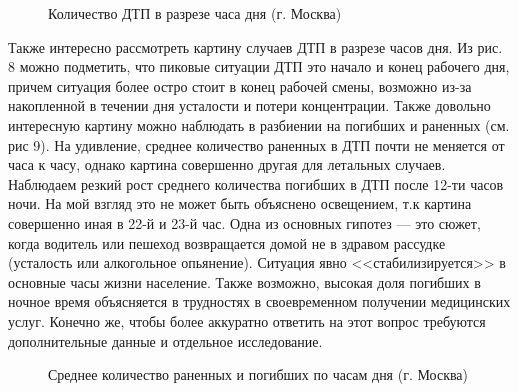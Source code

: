 \documentclass[a4paper, 14pt]{article}
\begin{document}
\begin{figure}[h]
	\caption{Количество ДТП в разрезе часа дня (г. Москва)}
\end{figure}

Также интересно рассмотреть картину случаев ДТП в разрезе часов дня. Из рис. 8 можно подметить, что пиковые ситуации ДТП это начало и конец рабочего дня, причем ситуация более остро стоит в конец рабочей смены, возможно из-за накопленной в течении дня усталости и потери концентрации. Также довольно интересную картину можно наблюдать в разбиении на погибших и раненных (см. рис 9). На удивление, среднее количество раненных в ДТП почти не меняется от часа к часу, однако картина совершенно другая для летальных случаев. Наблюдаем резкий рост среднего количества погибших в ДТП после 12-ти часов ночи. На мой взгляд это не может быть объяснено освещением, т.к картина совершенно иная в 22-й и 23-й час. Одна из основных гипотез --- это сюжет, когда водитель или пешеход возвращается домой не в здравом рассудке (усталость или алкогольное опьянение). Ситуация явно <<стабилизируется>> в основные часы жизни население. Также возможно, высокая доля погибших в ночное время объясняется в трудностях в своевременном получении медицинских услуг. Конечно же, чтобы более аккуратно ответить на этот вопрос требуются дополнительные данные и отдельное исследование.

\begin{figure}[h]
	\caption{Среднее количество раненных и погибших по часам дня (г. Москва)}
\end{figure} 
\end{document}
